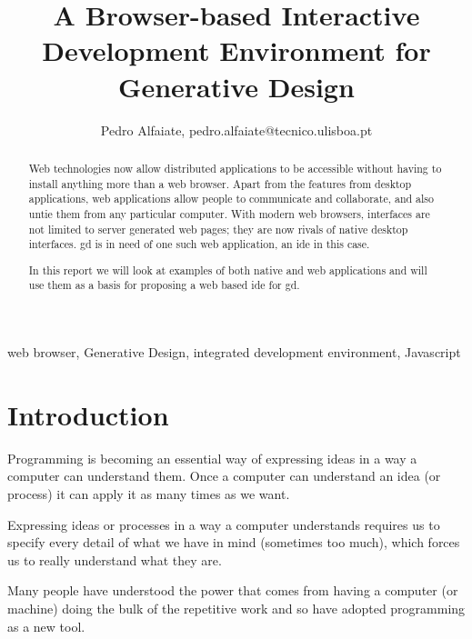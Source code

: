 \documentclass{./llncs2e/llncs}
\begin{document}
\title{A Browser-based Interactive Development Environment for Generative Design}

\author{Pedro Alfaiate, pedro.alfaiate@tecnico.ulisboa.pt}

\maketitle

\begin{abstract}
	Web technologies now allow distributed applications to be accessible without having to install anything more than a web browser.
	Apart from the features from desktop applications, web applications allow people to communicate and collaborate, and also untie them from any particular computer.
	With modern web browsers, interfaces are not limited to server generated web pages;
	they are now rivals of native desktop interfaces.
	\ac{gd} is in need of one such web application, an \ac{ide} in this case.
	
	In this report we will look at examples of both native and web applications and will use them as a basis for proposing a web based \ac{ide} for \ac{gd}.
\end{abstract}
\begin{keywords}
web browser, Generative Design, integrated development environment, Javascript
\end{keywords}

\tableofcontents
\section{Introduction}
	Programming is becoming an essential way of expressing ideas in a way a computer can understand them.
	Once a computer can understand an idea (or process) it can apply it as many times as we want.

	Expressing ideas or processes in a way a computer understands requires us to specify every detail of what we have in mind (sometimes too much), which forces us to really understand what they are.

	Many people have understood the power that comes from having a computer (or machine) doing the bulk of the repetitive work and so have adopted programming as a new tool.
\end{document}
